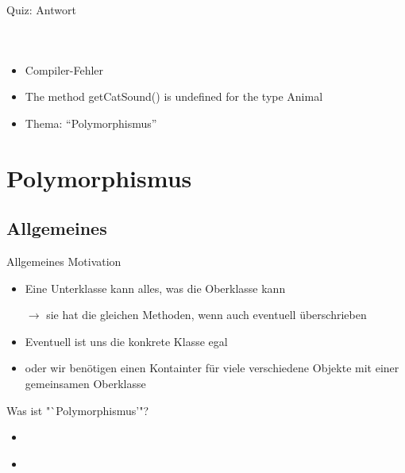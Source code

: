 \documentclass[usepdftitle=false,hyperref={pdfpagelabels=false}]{beamer}
\begin{document}
\begin{frame}{Quiz: Antwort}
    \begin{minipage}[b]{0.45\linewidth}
        \inputminted[linenos=false, numbersep=5pt, tabsize=4, fontsize=\tiny, label=Animal.java, frame=lines]{java}{Animal.java}
        \vspace{1cm}
        \inputminted[linenos=false, numbersep=5pt, tabsize=4, fontsize=\tiny, label=Jungle.java, frame=lines]{java}{Jungle.java}
    \end{minipage}
    \hspace{0.5cm}
    \begin{minipage}[b]{0.45\linewidth}
        \inputminted[linenos=false, numbersep=5pt, tabsize=4, fontsize=\tiny, label=Cat.java, frame=lines]{java}{Cat.java}
        \begin{itemize}
            \item Compiler-Fehler
            \item The method getCatSound() is undefined for the type Animal
            \item Thema: "`Polymorphismus"'
        \end{itemize}
    \end{minipage}
\end{frame}

\section{Polymorphismus}
\subsection{Allgemeines}
\begin{frame}{Allgemeines}
    Motivation
    \begin{itemize}
        \item Eine Unterklasse kann alles, was die Oberklasse kann
        \item[$\rightarrow$] sie hat die gleichen Methoden, wenn auch eventuell überschrieben
        \item Eventuell ist uns die konkrete Klasse egal
        \item oder wir benötigen einen Kontainter für viele verschiedene 
              Objekte mit einer gemeinsamen Oberklasse
    \end{itemize}

    Was ist "`Polymorphismus'"?
    \begin{itemize}
        \item {}
        \item {}\\
    \end{itemize}
\end{frame}
\end{document}
